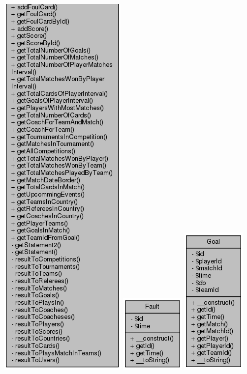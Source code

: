 \documentclass[11pt]{article}
\begin{document}
\includegraphics[scale=0.4]{UML_Database3.png}
\includegraphics[scale=0.4]{UML_Fault.png}
\includegraphics[scale=0.4]{UML_Goal.png}
\end{document}
